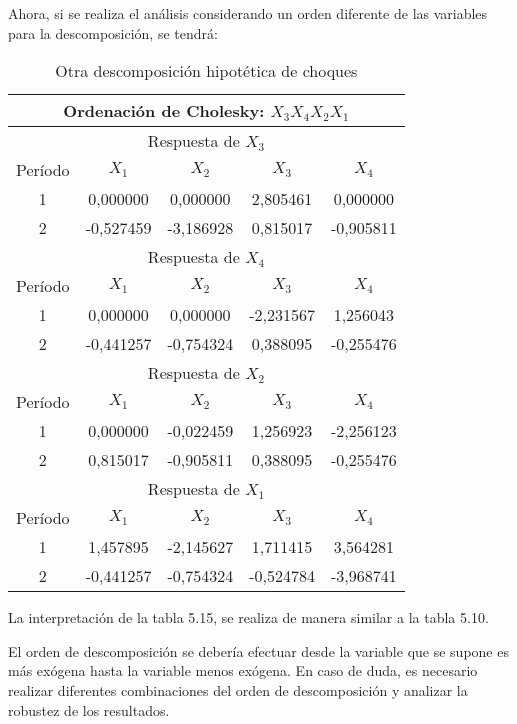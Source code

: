 \begin{enumerate}
Ahora, si se realiza el an\'{a}lisis considerando un orden diferente de las variables para la descomposici\'{o}n, se tendr\'{a}:

\begin{table}[H]
\centering
\begin{tabular}{|c|c|c|c|c|}\hline
\multicolumn{5}{|c|}{Ordenaci\'{o}n de Cholesky: $X_{3} X_{4} X_{2} X_{1}$} \\ \hline
\multicolumn{5}{|c|}{Respuesta de $X_{3}$} \\ \hline
Per\'{i}odo & $X_{1}$ & $X_{2}$ & $X_{3}$ & $X_{4}$ \\ \hline
1 & 0,000000 & 0,000000 & 2,805461 & 0,000000 \\ \hline
2 & -0,527459 & -3,186928 & 0,815017 & -0,905811 \\ \hline
\multicolumn{5}{|c|}{Respuesta de $X_{4}$} \\ \hline
Per\'{i}odo & $X_{1}$ & $X_{2}$ & $X_{3}$ & $X_{4}$ \\ \hline
1 & 0,000000 & 0,000000 & -2,231567 & 1,256043 \\ \hline
2 & -0,441257 & -0,754324 & 0,388095 & -0,255476 \\ \hline
\multicolumn{5}{|c|}{Respuesta de $X_{2}$} \\ \hline
Per\'{i}odo & $X_{1}$ & $X_{2}$ & $X_{3}$ & $X_{4}$ \\ \hline
1 & 0,000000 & -0,022459 & 1,256923 & -2,256123 \\ \hline
2 & 0,815017 & -0,905811 & 0,388095 & -0,255476 \\ \hline
\multicolumn{5}{|c|}{Respuesta de $X_{1}$} \\ \hline
Per\'{i}odo & $X_{1}$ & $X_{2}$ & $X_{3}$ & $X_{4}$ \\ \hline
1 & 1,457895 & -2,145627 & 1,711415 & 3,564281 \\ \hline
2 & -0,441257 & -0,754324 & -0,524784 & -3,968741 \\ \hline
\end{tabular}
\caption{Otra descomposici\'{o}n hipot\'{e}tica de choques}
\label{tab28}
\end{table}

La interpretaci\'{o}n de la tabla 5.15, se realiza de manera similar a la tabla 5.10.\newline

El orden de descomposici\'{o}n se deber\'{i}a efectuar desde la variable que se supone es m\'{a}s ex\'{o}gena hasta la variable menos ex\'{o}gena. En caso de duda, es necesario realizar diferentes combinaciones del orden de descomposici\'{o}n y analizar la robustez de los resultados.


\end{enumerate}
